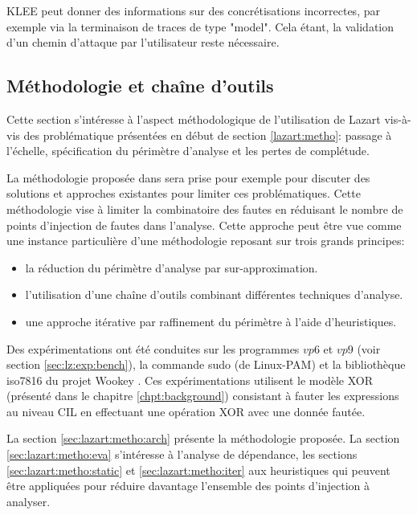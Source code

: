                     KLEE peut donner des informations sur des concrétisations incorrectes, par exemple via la terminaison de traces de type "model". Cela étant, la validation d'un chemin d'attaque par l'utilisateur reste nécessaire.  
            
        \subsection{Méthodologie et chaîne d'outils}
        \label{sec:lazart-metho-andtools}
        
            Cette section s'intéresse à l'aspect méthodologique de l'utilisation de Lazart vis-à-vis des problématique présentées en début de section \ref{lazart:metho}: passage à l'échelle, spécification du périmètre d'analyse et les pertes de complétude.
            
            La méthodologie proposée dans \cite{lacombe2021combining, lacombe2023combining} sera prise pour exemple pour discuter des solutions et approches existantes pour limiter ces problématiques.
            Cette méthodologie vise à limiter la combinatoire des fautes en réduisant le nombre de points d'injection de fautes dans l'analyse.
            Cette approche peut être vue comme une instance particulière d'une méthodologie reposant sur trois grands principes:
            \begin{itemize}
               \item la réduction du périmètre d'analyse par sur-approximation.
               \item l'utilisation d'une chaîne d'outils combinant différentes techniques d'analyse.
               \item une approche itérative par raffinement du périmètre à l'aide d'heuristiques.
            \end{itemize}
            
            Des expérimentations ont été conduites sur les programmes $vp6$ et $vp9$ (voir section \ref{sec:lz:exp:bench}), la commande sudo (de Linux-PAM) et la bibliothèque iso7816 du projet Wookey \cite{wookey}. 
            Ces expérimentations utilisent le modèle XOR (présenté dans le chapitre \ref{chpt:background}) consistant à fauter les expressions au niveau CIL en effectuant une opération XOR avec une donnée fautée. 
            
            La section \ref{sec:lazart:metho:arch} présente la méthodologie proposée.
            La section \ref{sec:lazart:metho:eva} s'intéresse à l'analyse de dépendance,
            les sections \ref{sec:lazart:metho:static} et  \ref{sec:lazart:metho:iter} aux heuristiques qui peuvent être appliquées pour réduire davantage l'ensemble des points d'injection à analyser.
           
